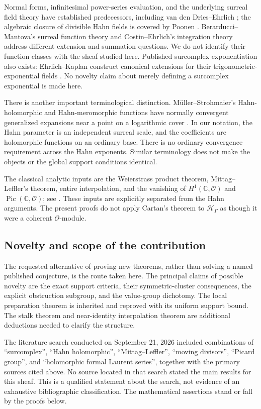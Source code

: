 \documentclass[11pt,letterpaper]{article}
\theoremstyle{definition}
\theoremstyle{remark}
\newcommand{\C}{\mathbb C}
\newcommand{\OO}{\mathcal O}
\newcommand{\HH}{\mathscr H_\Gamma}
\newcommand{\Pic}{\operatorname{Pic}}
\numberwithin{equation}{section}
\begin{document}
Normal forms, infinitesimal power-series evaluation, and the underlying surreal field theory have established predecessors, including van den Dries--Ehrlich \cite{vdDE}; the algebraic closure of divisible Hahn fields is covered by Poonen \cite{Poonen}. Berarducci--Mantova's surreal function theory \cite{BM} and Costin--Ehrlich's integration theory \cite{CE} address different extension and summation questions. We do not identify their function classes with the sheaf studied here. Published surcomplex exponentiation also exists: Ehrlich--Kaplan construct canonical extensions for their trigonometric-exponential fields \cite[\S11]{EK}. No novelty claim about merely defining a surcomplex exponential is made here.

There is another important terminological distinction. M\"uller--Strohmaier's Hahn-holomorphic and Hahn-meromorphic functions have normally convergent generalized expansions near a point on a logarithmic cover \cite{MS}. In our notation, the Hahn parameter is an independent surreal scale, and the coefficients are holomorphic functions on an ordinary base. There is no ordinary convergence requirement across the Hahn exponents. Similar terminology does not make the objects or the global support conditions identical.

The classical analytic inputs are the Weierstrass product theorem, Mittag--Leffler's theorem, entire interpolation, and the vanishing of $H^1(\C,\OO)$ and $\Pic(\C,\OO)$; see \cite{Ahlfors,Demailly}. These inputs are explicitly separated from the Hahn arguments. The present proofs do not apply Cartan's theorem to $\HH$ as though it were a coherent $\OO$-module.

\subsection{Novelty and scope of the contribution}
The requested alternative of proving new theorems, rather than solving a named published conjecture, is the route taken here. The principal claims of possible novelty are the exact support criteria, their symmetric-cluster consequences, the explicit obstruction subgroup, and the value-group dichotomy. The local preparation theorem is inherited and reproved with its uniform support bound. The stalk theorem and near-identity interpolation theorem are additional deductions needed to clarify the structure.

The literature search conducted on September 21, 2026 included combinations of ``surcomplex'', ``Hahn holomorphic'', ``Mittag--Leffler'', ``moving divisors'', ``Picard group'', and ``holomorphic formal Laurent series'', together with the primary sources cited above. No source located in that search stated the main results for this sheaf. This is a qualified statement about the search, not evidence of an exhaustive bibliographic classification. The mathematical assertions stand or fall by the proofs below.
\end{document}
